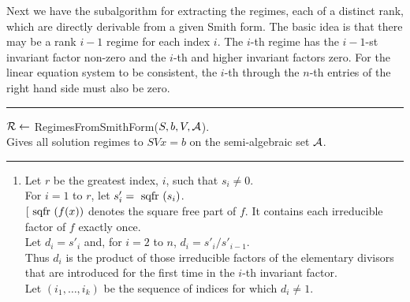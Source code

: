 \documentclass[10pt]{article}
\newcommand{\Line} {\vspace{1ex} \hrule \vspace{1ex}}
\begin{document}
\newpage
Next we have the subalgorithm for extracting the regimes, each of a distinct
rank, which are directly derivable from a given Smith form.
The basic idea is that there may be a rank $i-1$ regime for each index $i$.
The $i$-th regime has the $i-1$-st invariant factor non-zero and the $i$-th
and higher invariant factors zero.  
For the linear equation system to be consistent, 
the $i$-th through the $n$-th entries of the right hand side must also be zero. 

\Line
\begin{center}
${\cal R} \leftarrow$ RegimesFromSmithForm($S, b, V, {\cal A}$).\\
\bc Gives all solution regimes to $SVx = b$ on the semi-algebraic set ${\cal A}$.\ec
\end{center}
\Line
\begin{enumerate}
\item
Let $r$ be the greatest index, $i$, such that $s_i \neq 0$.\\ 
For $i = 1$ to $r$, let $s'_i = ~\mbox{sqfr}~(s_i)$.\\
$[~\mbox{sqfr}~(f(x))$ denotes the square free part of $f$.  It contains each 
irreducible factor of $f$ exactly once. \ec  \\
Let $d_i = s'_i$ and, for $i = 2$ to $n$, $d_i = s'_i/s'_{i-1}$.\\
\bc Thus $d_i$ is the product of those
irreducible factors of the elementary divisors that are introduced for 
the first time in the $i$-th invariant factor. \ec \\
Let $(i_1, \ldots, i_k)$ be the sequence of indices for which $d_i \neq 1$.


\end{enumerate}
\end{document}
